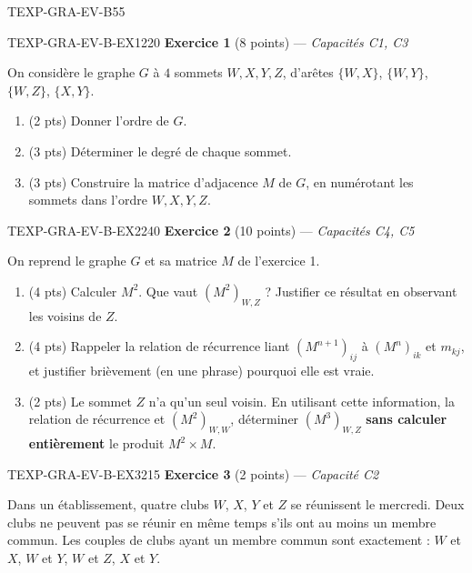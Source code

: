 \begin{evaluation}{TEXP-GRA-EV-B}{55}

\begin{exercice}{TEXP-GRA-EV-B-EX1}{2}{20}
\textbf{Exercice 1} (8 points) --- \textit{Capacités C1, C3}

\medskip

On considère le graphe $G$ à $4$ sommets $W,X,Y,Z$, d'arêtes $\{W,X\}$, $\{W,Y\}$, $\{W,Z\}$, $\{X,Y\}$.

\begin{enumerate}
  \item (2 pts) Donner l'ordre de $G$.
  \item (3 pts) Déterminer le degré de chaque sommet.
  \item (3 pts) Construire la matrice d'adjacence $M$ de $G$, en numérotant les sommets dans l'ordre $W,X,Y,Z$.
\end{enumerate}
\end{exercice}

\begin{exercice}{TEXP-GRA-EV-B-EX2}{2}{40}
\textbf{Exercice 2} (10 points) --- \textit{Capacités C4, C5}

\medskip

On reprend le graphe $G$ et sa matrice $M$ de l'exercice 1.

\begin{enumerate}
  \item (4 pts) Calculer $M^2$. Que vaut $(M^2)_{W,Z}$ ? Justifier ce résultat en observant les voisins de $Z$.
  \item (4 pts) Rappeler la relation de récurrence liant $(M^{n+1})_{ij}$ à $(M^n)_{ik}$ et $m_{kj}$, et justifier brièvement (en une phrase) pourquoi elle est vraie.
  \item (2 pts) Le sommet $Z$ n'a qu'un seul voisin. En utilisant cette information, la relation de récurrence et $(M^2)_{W,W}$, déterminer $(M^3)_{W,Z}$ \textbf{sans calculer entièrement} le produit $M^2\times M$.
\end{enumerate}
\end{exercice}

\begin{exercice}{TEXP-GRA-EV-B-EX3}{2}{15}
\textbf{Exercice 3} (2 points) --- \textit{Capacité C2}

\medskip

Dans un établissement, quatre clubs $W$, $X$, $Y$ et $Z$ se réunissent le mercredi. Deux clubs ne peuvent pas se réunir en même temps s'ils ont au moins un membre commun. Les couples de clubs ayant un membre commun sont exactement : $W$ et $X$, $W$ et $Y$, $W$ et $Z$, $X$ et $Y$.


\end{exercice}
\end{evaluation}
